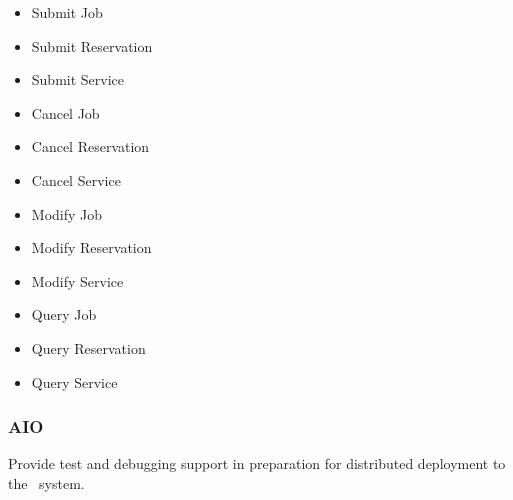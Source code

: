     \begin{itemize} 
      \item{Submit Job}
      \item{Submit Reservation}
      \item{Submit Service}
      \item{Cancel Job}
      \item{Cancel Reservation}
      \item{Cancel Service}
      \item{Modify Job}
      \item{Modify Reservation}
      \item{Modify Service}
      \item{Query Job}
      \item{Query Reservation}
      \item{Query Service}
    \end{itemize}
         
    \subsubsection{AIO}
    
    Provide test and debugging support in preparation for distributed deployment to the
    \varDUCC~system.
    
